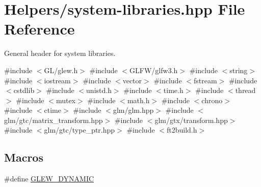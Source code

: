 \hypertarget{system-libraries_8hpp}{}\section{Helpers/system-\/libraries.hpp File Reference}
\label{system-libraries_8hpp}


General header for system libraries.  


{\ttfamily \#include $<$G\+L/glew.\+h$>$}\newline
{\ttfamily \#include $<$G\+L\+F\+W/glfw3.\+h$>$}\newline
{\ttfamily \#include $<$string$>$}\newline
{\ttfamily \#include $<$iostream$>$}\newline
{\ttfamily \#include $<$vector$>$}\newline
{\ttfamily \#include $<$fstream$>$}\newline
{\ttfamily \#include $<$cstdlib$>$}\newline
{\ttfamily \#include $<$unistd.\+h$>$}\newline
{\ttfamily \#include $<$time.\+h$>$}\newline
{\ttfamily \#include $<$thread$>$}\newline
{\ttfamily \#include $<$mutex$>$}\newline
{\ttfamily \#include $<$math.\+h$>$}\newline
{\ttfamily \#include $<$chrono$>$}\newline
{\ttfamily \#include $<$ctime$>$}\newline
{\ttfamily \#include $<$glm/glm.\+hpp$>$}\newline
{\ttfamily \#include $<$glm/gtc/matrix\+\_\+transform.\+hpp$>$}\newline
{\ttfamily \#include $<$glm/gtx/transform.\+hpp$>$}\newline
{\ttfamily \#include $<$glm/gtc/type\+\_\+ptr.\+hpp$>$}\newline
{\ttfamily \#include $<$ft2build.\+h$>$}\newline
\subsection*{Macros}
\begin{DoxyCompactItemize}
\item 
\#define \mbox{\hyperlink{system-libraries_8hpp_a1df29b21e01c0880c00e4dca1cd34a20}{G\+L\+E\+W\+\_\+\+D\+Y\+N\+A\+M\+IC}}
\end{DoxyCompactItemize}


